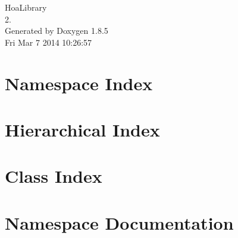 \documentclass[twoside]{book}
\newcommand{\clearemptydoublepage}{%
  \newpage{\pagestyle{empty}\cleardoublepage}%
}
\begin{document}
\hypersetup{pageanchor=false}
\begin{titlepage}
\vspace*{7cm}
\begin{center}%
{\Large Hoa\-Library \\[1ex]\large 2. }\\
\vspace*{1cm}
{\large Generated by Doxygen 1.8.5}\\
\vspace*{0.5cm}
{\small Fri Mar 7 2014 10:26:57}\\
\end{center}
\end{titlepage}
\clearemptydoublepage
\tableofcontents
\clearemptydoublepage
{}
\hypersetup{pageanchor=true}

\chapter{Namespace Index}

\chapter{Hierarchical Index}

\chapter{Class Index}

\chapter{Namespace Documentation}



\end{document}
